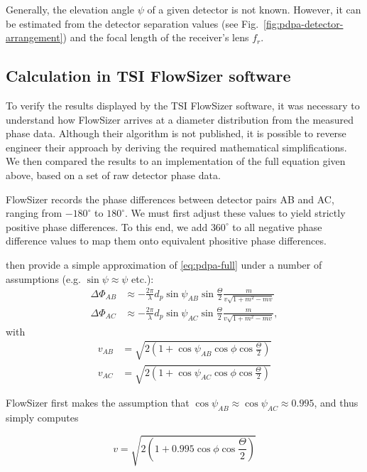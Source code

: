 \documentclass[11.5pt]{book}
\newcommand*{\figref}[1]{Fig.~\ref{#1}}
\begin{document}
Generally, the elevation angle $\psi$ of a given detector is not known. However,
it can be estimated from the detector separation values (see
\figref{fig:pdpa-detector-arrangement}) and the focal length of the receiver's
lens $f_r$.

\subsection{Calculation in TSI FlowSizer software}
To verify the results displayed by the TSI FlowSizer software, it was necessary to
understand how FlowSizer arrives at a diameter distribution from the measured
phase data. Although their algorithm is not published, it is possible to reverse
engineer their approach by deriving the required mathematical simplifications.
We then compared the results to an implementation of the full equation given
above, based on a set of raw detector phase data.

FlowSizer records the phase differences between detector pairs AB and AC,
ranging from $-180^\circ$ to $180^\circ$. We must first adjust these values to
yield strictly positive phase differences. To this end, we add $360^\circ$ to
all negative phase difference values to map them onto equivalent phositive phase
differences.

\citet{Albrecht03} then provide a simple approximation of \eqref{eq:pdpa-full}
under a number of assumptions (e.g. $\sin \psi \approx \psi$ etc.):
\begin{align}
    \Delta\Phi_{AB} &\approx -\frac{2\pi}{\lambda} d_p \sin \psi_{AB} \sin
    \frac{\Theta}{2}\frac{m}{v \sqrt{1 + m^2 - mv}}
    \label{eq:pdpa-phase-simple-ab}\\
    \Delta\Phi_{AC} &\approx -\frac{2\pi}{\lambda} d_p \sin \psi_{AC} \sin
    \frac{\Theta}{2}\frac{m}{v \sqrt{1 + m^2 - mv}}, \label{eq:pdpa-phase-simple-ac}
\end{align}
with 
\begin{align}
    v_{AB} &= \sqrt{2(1 + \cos \psi_{AB} \cos \phi \cos \frac{\Theta}{2})} \\
    v_{AC} &= \sqrt{2(1 + \cos \psi_{AC} \cos \phi \cos \frac{\Theta}{2})}
\end{align}

FlowSizer first makes the assumption that $\cos \psi_{AB} \approx \cos \psi_{AC} \approx
0.995$, and thus simply computes

\begin{equation}
    v = \sqrt{2(1 + 0.995 \cos \phi \cos \frac{\Theta}{2})}
\end{equation}
\end{document}
